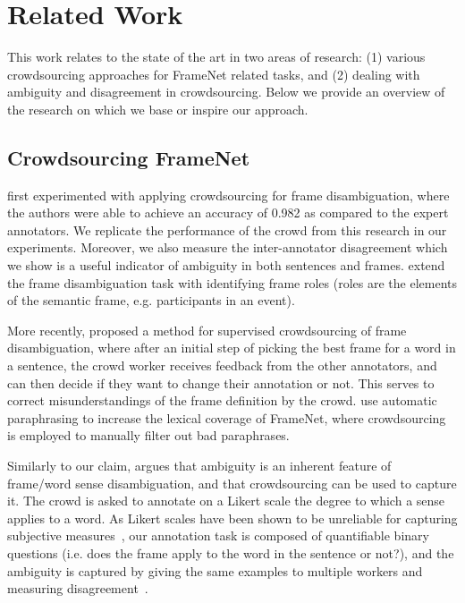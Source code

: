 \section{Related Work}
This work relates to the state of the art in two areas of research: (1) various crowdsourcing approaches for FrameNet related tasks, and (2) dealing with ambiguity and disagreement in crowdsourcing. Below we provide an overview of the research on which we base or inspire our approach. 
\subsection{Crowdsourcing FrameNet}

\citet{Hong:2011:GCR:2018966.2018970} first experimented with applying crowdsourcing for frame disambiguation, where the authors were able to achieve an accuracy of 0.982 as compared to the expert annotators. We replicate the performance of the crowd from this research in our experiments. Moreover, we also measure the inter-annotator disagreement which we show is a useful indicator of ambiguity in both sentences and frames. \citet{fossati2013outsourcing} extend the frame disambiguation task with identifying frame roles (roles are the elements of the semantic frame, e.g. participants in an event).

More recently, \citet{chang2015scaling} proposed a method for supervised crowdsourcing of frame disambiguation, where after an initial step of picking the best frame for a word in a sentence, the crowd worker receives feedback from the other annotators, and can then decide if they want to change their annotation or not. This serves to correct misunderstandings of the frame definition by the crowd. \citet{pavlick2015framenet+} use automatic paraphrasing to increase the lexical coverage of FrameNet, where crowdsourcing is employed to manually filter out bad paraphrases.

Similarly to our claim, \citet{jurgens2013embracing} argues that ambiguity is an inherent feature of frame/word sense disambiguation, and that crowdsourcing can be used to capture it. The crowd is asked to annotate on a Likert scale the degree to which a sense applies to a word. As Likert scales have been shown to be unreliable for capturing subjective measures~\cite{Kittur:2008:CUS:1357054.1357127}, our annotation task is composed of quantifiable binary questions (i.e. does the frame apply to the word in the sentence or not?), and the ambiguity is captured by giving the same examples to multiple workers and measuring disagreement~\cite{aroyo2014threesides}.

